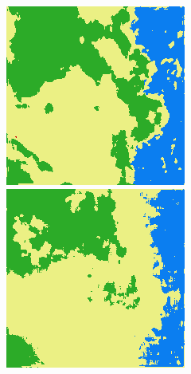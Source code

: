 \begin{figure}
    \includegraphics[width=\DensenetPredictionsImageWidth]{images/densenet/densenet-67D/626312-prediction} \hfill
    \includegraphics[width=\DensenetPredictionsImageWidth]{images/densenet/densenet-56D/626312-prediction}


\end{figure}
